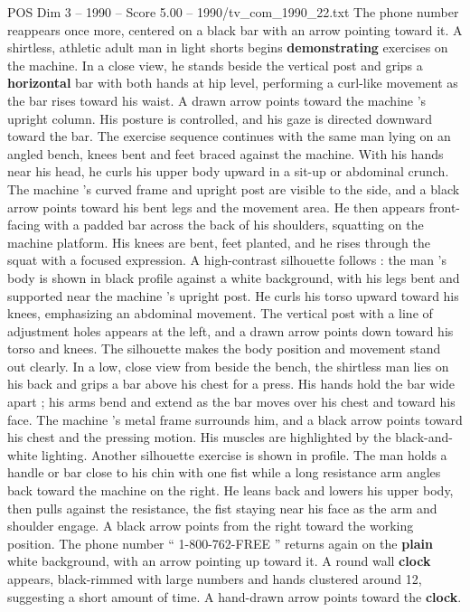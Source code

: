 \begin{textsample}{POS Dim 3 – 1990 – Score 5.00 – 1990/tv\_com\_1990\_22.txt}
The phone number reappears once more, centered on a black bar with an arrow pointing toward it.
A shirtless, athletic adult man in light shorts begins \textbf{demonstrating} exercises on the machine.
In a close view, he stands beside the vertical post and grips a \textbf{horizontal} bar with both hands at hip level, performing a curl-like movement as the bar rises toward his waist.
A drawn arrow points toward the machine ’s upright column.
His posture is controlled, and his gaze is directed downward toward the bar.
The exercise sequence continues with the same man lying on an angled bench, knees bent and feet braced against the machine.
With his hands near his head, he curls his upper body upward in a sit-up or abdominal crunch.
The machine ’s curved frame and upright post are visible to the side, and a black arrow points toward his bent legs and the movement area.
He then appears front-facing with a padded bar across the back of his shoulders, squatting on the machine platform.
His knees are bent, feet planted, and he rises through the squat with a focused expression.
A high-contrast silhouette follows : the man ’s body is shown in black profile against a white background, with his legs bent and supported near the machine ’s upright post.
He curls his torso upward toward his knees, emphasizing an abdominal movement.
The vertical post with a line of adjustment holes appears at the left, and a drawn arrow points down toward his torso and knees.
The silhouette makes the body position and movement stand out clearly.
In a low, close view from beside the bench, the shirtless man lies on his back and grips a bar above his chest for a press.
His hands hold the bar wide apart ; his arms bend and extend as the bar moves over his chest and toward his face.
The machine ’s metal frame surrounds him, and a black arrow points toward his chest and the pressing motion.
His muscles are highlighted by the black-and-white lighting.
Another silhouette exercise is shown in profile.
The man holds a handle or bar close to his chin with one fist while a long resistance arm angles back toward the machine on the right.
He leans back and lowers his upper body, then pulls against the resistance, the fist staying near his face as the arm and shoulder engage.
A black arrow points from the right toward the working position.
The phone number “ 1-800-762-FREE ” returns again on the \textbf{plain} white background, with an arrow pointing up toward it.
A round wall \textbf{clock} appears, black-rimmed with large numbers and hands clustered around 12, suggesting a short amount of time.
A hand-drawn arrow points toward the \textbf{clock}.

\end{textsample}
